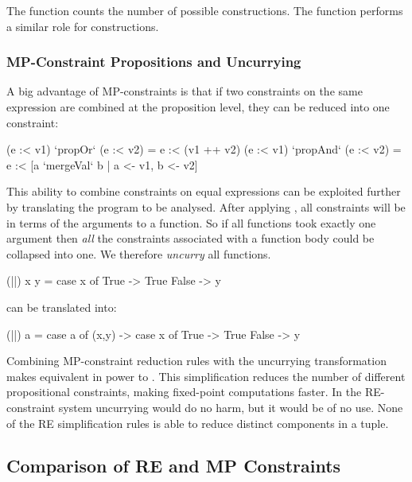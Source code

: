 The  function counts the number of possible  constructions. The  function performs a similar role for  constructions.


\subsubsection{MP-Constraint Propositions and Uncurrying}

A big advantage of MP-constraints is that if two constraints on the same expression are combined at the proposition level, they can be reduced into one constraint:

\ignore\begin{code}
(e :< v1)  `propOr`   (e :< v2) = e :< (v1 ++ v2)
(e :< v1)  `propAnd`  (e :< v2) = e :< [a `mergeVal` b | a <- v1, b <- v2]
\end{code}

\noindent This ability to combine constraints on equal expressions can be exploited further by translating the program to be analysed. After applying , all constraints will be in terms of the arguments to a function. So if all functions took exactly one argument then \textit{all} the constraints associated with a function body could be collapsed into one. We therefore \textit{uncurry} all functions.

\begin{example}
\begin{code}
(||) x y = case  x of
                 True   -> True
                 False  -> y
\end{code}

\noindent can be translated into:

\begin{code}
(||) a = case  a of
               (x,y) -> case  x of
                              True    -> True
                              False   -> y
\end{code}\codeexample
\end{example}

Combining MP-constraint reduction rules with the uncurrying transformation makes  equivalent in power to . This simplification reduces the number of different propositional constraints, making fixed-point computations faster. In the RE-constraint system uncurrying would do no harm, but it would be of no use. None of the RE simplification rules is able to reduce distinct components in a tuple.

\subsection{Comparison of RE and MP Constraints}


